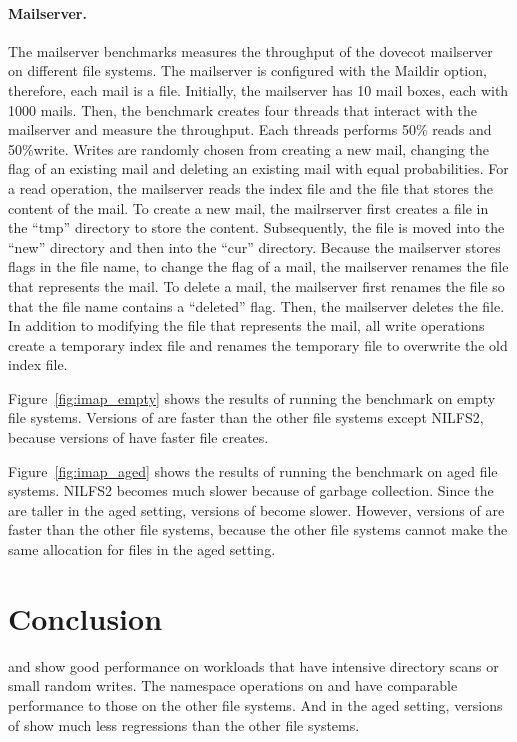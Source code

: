 \paragraph{Mailserver.}

The mailserver benchmarks measures the throughput of the dovecot mailserver on
different file systems.
The mailserver is configured with the Maildir option, therefore, each mail is a
file.
Initially, the mailserver has 10 mail boxes, each with 1000 mails.
Then, the benchmark creates four threads that interact with the mailserver and
measure the throughput.
Each threads performs 50\% reads and 50\%write.
Writes are randomly chosen from
creating a new mail, changing the flag of an
existing mail and deleting an existing mail with equal probabilities.
For a read operation, the mailserver reads the index file and the file that
stores the content of the mail.
To create a new mail, the mailrserver first creates a file in the ``tmp''
directory to store the content.
Subsequently, the file is moved into the ``new'' directory and
then into the ``cur'' directory.
Because the mailserver stores flags in the file name, to change the flag of
a mail, the mailserver renames the file that represents the mail.
To delete a mail, the mailserver first renames the file so that the file name
contains a ``deleted'' flag.
Then, the mailserver deletes the file.
In addition to modifying the file that represents the mail, all write operations
create a temporary index file and
renames the temporary file to overwrite the old index file.

Figure~\ref{fig:imap_empty} shows the results of running the benchmark on empty file
systems.
Versions of \betrfs are faster than the other file systems except NILFS2,
because versions of \betrfs have faster file creates.

Figure~\ref{fig:imap_aged} shows the results of running the benchmark on
aged file systems.
NILFS2 becomes much slower because of garbage collection.
Since the \bets are taller in the aged setting, versions of \betrfs become
slower.
However, versions of \betrfs are faster than the other file systems, because
the other file systems cannot make the same allocation for files in the aged
setting.

\section{Conclusion}

\betrfsFour and \betrfsFive show good performance on workloads that have
intensive directory scans or small random writes.
The namespace operations on \betrfsFour and \betrfsFive have comparable
performance to those on the other file systems.
And in the aged setting, versions of \betrfs show much less regressions than
the other file systems.

